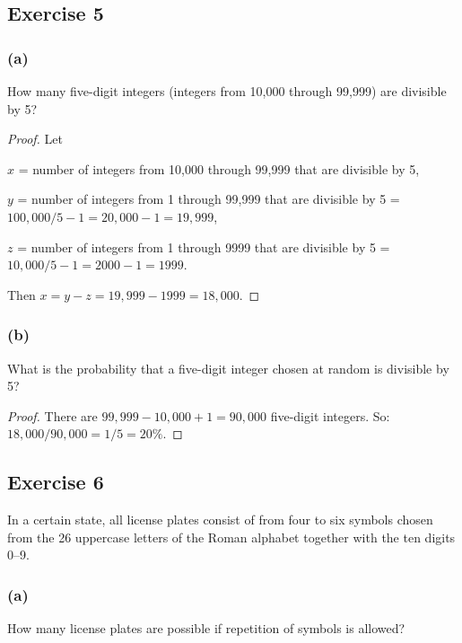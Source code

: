 \documentclass[14pt]{extarticle}
\begin{document}
\subsection{Exercise 5}
\subsubsection{(a)}
How many five-digit integers (integers from 10,000 through 99,999) are divisible by 5?

\begin{proof}
Let 

$x$ = number of integers from 10,000 through 99,999 that are divisible by 5,

$y$ = number of integers from 1 through 99,999 that are divisible by 5 = \(100,000 / 5 - 1 = 20,000 - 1 = 19,999\),

$z$ = number of integers from 1 through 9999 that are divisible by 5 = \(10,000 / 5 - 1 = 2000 - 1 = 1999\).

Then \(x = y - z = 19,999 - 1999 = 18,000\).
\end{proof}

\subsubsection{(b)}
What is the probability that a five-digit integer chosen at random is divisible by 5?

\begin{proof}
There are \(99,999 - 10,000 + 1 = 90,000\) five-digit integers. So: \(18,000 / 90,000 = 1/5 = 20\%\).
\end{proof}

\subsection{Exercise 6}
In a certain state, all license plates consist of from four to six symbols chosen from the 26 uppercase letters of the 
Roman alphabet together with the ten digits 0–9.

\subsubsection{(a)}
How many license plates are possible if repetition of symbols is allowed?
\end{document}

